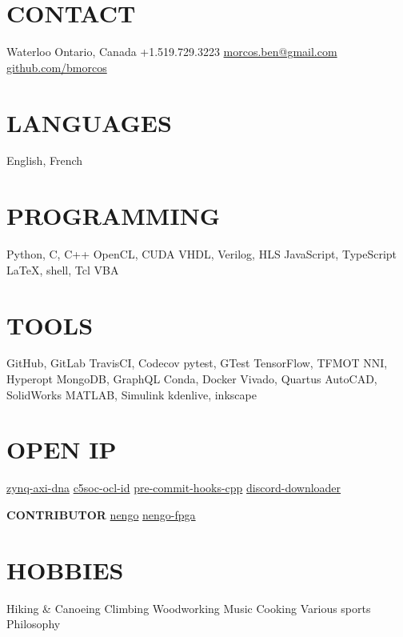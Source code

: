 \documentclass[a4paper,nocolors]{cv-friggeri-ben}
\begin{document}


\begin{aside} %
    \section{CONTACT}
    \hfill Waterloo
    \hfill Ontario, Canada
    \vspace{0.5\baselineskip} \hfill +1.519.729.3223
    \hfill \href{mailto:morcos.ben@gmail.com}{morcos.ben@gmail.com}
    \vspace{0.5\baselineskip} \hfill%
    \href{https://github.com/bmorcos}{github.com/bmorcos}
    \section{LANGUAGES}
    English, French
    \section{PROGRAMMING}
    Python, C, C++
    OpenCL, CUDA
    VHDL, Verilog, HLS
    JavaScript, TypeScript
    \LaTeX, shell, Tcl
    VBA
    \section{TOOLS}
    GitHub, GitLab
    TravisCI, Codecov
    pytest, GTest
    TensorFlow, TFMOT
    NNI, Hyperopt
    MongoDB, GraphQL
    Conda, Docker
    Vivado, Quartus
    AutoCAD, SolidWorks
    MATLAB, Simulink
    kdenlive, inkscape
    \section{OPEN IP}
    \href{https://github.com/abr/zynq-axi-dna}{zynq-axi-dna}
    \href{https://github.com/abr/c5soc-ocl-id}{c5soc-ocl-id}
    \href{https://github.com/bmorcos/pre-commit-hooks-cpp}{pre-commit-hooks-cpp}
    \href{https://github.com/bmorcos/discord-downloader}{discord-downloader}
    \par\vspace{0.5\baselineskip}\textbf{CONTRIBUTOR}
    \href{https://github.com/nengo/nengo}{nengo}
    \href{https://github.com/nengo/nengo-fpga}{nengo-fpga}
    \section{HOBBIES}
    Hiking \& Canoeing
    Climbing
    Woodworking
    Music
    Cooking
    Various sports
    Philosophy
\end{aside}
\end{document}
